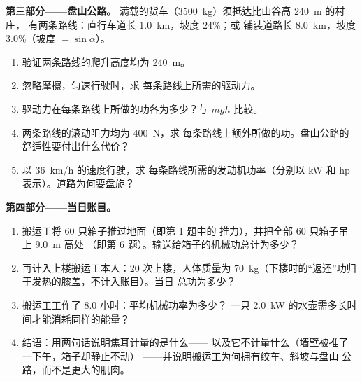 \begin{problem}
\medskip
\noindent\textbf{第三部分——盘山公路。}
满载的货车（\qty{3500}{kg}）须抵达比山谷高 \qty{240}{m} 的村庄，
有两条路线：直行车道长 \qty{1.0}{km}，坡度 $24\%$；或
铺装道路长 \qty{8.0}{km}，坡度 $3.0\%$（坡度 $= \sin\alpha$）。
\begin{enumerate}[resume]
  \item 验证两条路线的爬升高度均为 \qty{240}{m}。
  \item 忽略摩擦，匀速行驶时，求
        每条路线上所需的驱动力。
  \item 驱动力在每条路线上所做的功各为多少？与 $mgh$ 比较。
  \item 两条路线的滚动阻力均为 \qty{400}{N}，求
        每条路线上额外所做的功。盘山公路的舒适性要付出什么代价？
  \item 以 \qty{36}{km/h} 的速度行驶，求
        每条路线所需的发动机功率（分别以 \unit{kW} 和 \unit{hp} 表示）。道路为何要盘旋？
\end{enumerate}

\medskip
\noindent\textbf{第四部分——当日账目。}
\begin{enumerate}[resume]
  \item 搬运工将 $60$ 只箱子推过地面（即第 1 题中的
        推力），并把全部 $60$ 只箱子吊上 \qty{9.0}{m} 高处
        （即第 6 题）。输送给箱子的机械功总计为多少？
  \item 再计入上楼搬运工本人：$20$ 次上楼，人体质量为
        \qty{70}{kg}（下楼时的“返还”功归于发热的膝盖，不计入账目）。当日
        总功为多少？
  \item 搬运工工作了 $8.0$ 小时：平均机械功率为多少？
        一只 \qty{2.0}{kW} 的水壶需多长时间才能消耗同样的能量？
  \item 结语：用两句话说明焦耳计量的是什么——
        以及它不计量什么（墙壁被推了一下午，箱子却静止不动）
——并说明搬运工为何拥有绞车、斜坡与盘山
        公路，而不是更大的肌肉。
\end{enumerate}
\end{problem}
